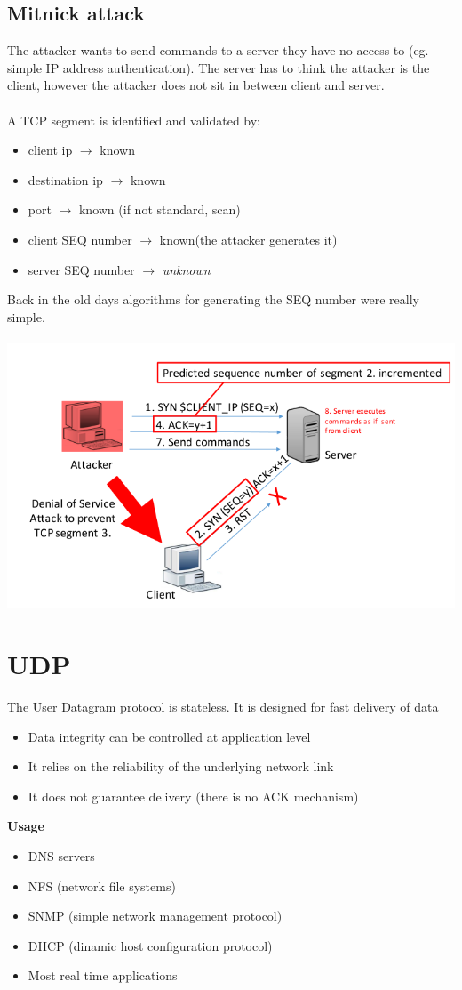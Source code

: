 \documentclass[10pt,a4paper]{book}
\begin{document}
\subsection{Mitnick attack}
The attacker wants to send commands to a server they have no access to (eg. simple IP address authentication). The server has to think the attacker is the client, however the attacker does not sit in between client and server.\\\\
A TCP segment is identified and validated by:
\begin{itemize}
\item client ip $\to$ known
\item destination ip $\to$ known
\item port $\to$ known (if not standard, scan)
\item client SEQ number $\to$ known(the attacker generates it)
\item server SEQ number $\to$ \emph{unknown}
\end{itemize}
Back in the old days algorithms for generating the SEQ number were really simple.\\\\
\includegraphics[scale=0.6]{img/mitnick-attack.png}
\newpage
\section{UDP}
The User Datagram protocol is stateless. It is designed for fast delivery of data
\begin{itemize}
\item Data integrity can be controlled at application level
\item It relies on the reliability of the underlying network link
\item It does not guarantee delivery (there is no ACK mechanism)
\end{itemize}
\textbf{Usage}
\begin{itemize}
\item DNS servers
\item NFS (network file systems)
\item SNMP (simple network management protocol)
\item DHCP (dinamic host configuration protocol)
\item Most real time applications
\end{itemize}
\end{document}
